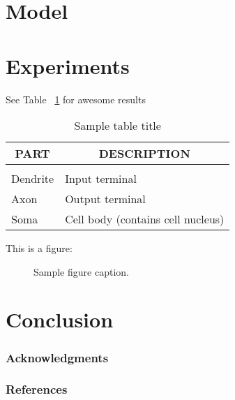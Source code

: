 \documentclass{article} %
\begin{document}
\section{Model}

\section{Experiments}
See Table ~\ref{sample-table} for awesome results

\begin{table}[h]
\caption{Sample table title}
\label{sample-table}
\begin{center}
\begin{tabular}{ll}
\multicolumn{1}{c}{\bf PART}  &\multicolumn{1}{c}{\bf DESCRIPTION}
\\ \hline \\
Dendrite         &Input terminal \\
Axon             &Output terminal \\
Soma             &Cell body (contains cell nucleus) \\
\end{tabular}
\end{center}
\end{table}

This is a figure:

\begin{figure}[h]
\begin{center}
\fbox{\rule[-.5cm]{0cm}{4cm} \rule[-.5cm]{4cm}{0cm}}
\end{center}
\caption{Sample figure caption.}
\end{figure}

\section{Conclusion}


\subsubsection*{Acknowledgments}



\subsubsection*{References}



\end{document}

